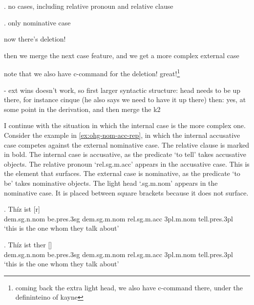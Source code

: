 \ex. no cases, including relative pronoun and relative clause

\ex. only nominative case

now there's deletion!

then we merge the next case feature, and we get a more complex external case

note that we also have c-command for the deletion! great!\footnote{
coming back the extra light head, we also have c-command there, under the defininteino of kayne
}





- ext wins doesn't work, so first larger syntactic structure: head needs to be up there, for instance cinque (he also says we need to have it up there)
then: yes, at some point in the derivation, and then merge the k2




I continue with the situation in which the internal case is the more complex one.
Consider the example in \ref{ex:ohg-nom-acc-rep}, in which the internal accusative case competes against the external nominative case. The relative clause is marked in bold.
The internal case is accusative, as the predicate  `to tell' takes accusative objects. The relative pronoun  `\ac{rel}.\ac{sg}.\ac{m}.\ac{acc}' appears in the accusative case. This is the element that surfaces.
The external case is nominative, as the predicate  `to be' takes nominative objects. The light head  `.\ac{sg}.\ac{m}.\ac{nom}' appears in the nominative case. It is placed between square brackets because it does not surface.

\exg. Thíz ist [r]   \\
\ac{dem}.\ac{sg}.\ac{n}.\ac{nom} be.\ac{pres}.3\ac{sg}\scsub{[nom]} \ac{dem}.\ac{sg}.\ac{m}.\ac{nom} \ac{rel}.\ac{sg}.\ac{m}.\ac{acc} 3\ac{pl}.\ac{m}.\ac{nom} tell.\ac{pres}.3\ac{pl}\scsub{[acc]}\\
`this is the one whom they talk about' \label{ex:ohg-nom-acc-rep}

\exg. Thíz ist ther []  \\
\ac{dem}.\ac{sg}.\ac{n}.\ac{nom} be.\ac{pres}.3\ac{sg}\scsub{[nom]} \ac{dem}.\ac{sg}.\ac{m}.\ac{nom} \ac{rel}.\ac{sg}.\ac{m}.\ac{acc} 3\ac{pl}.\ac{m}.\ac{nom} tell.\ac{pres}.3\ac{pl}\scsub{[acc]}\\
`this is the one whom they talk about' \label{ex:ohg-nom-acc-rep-1}


